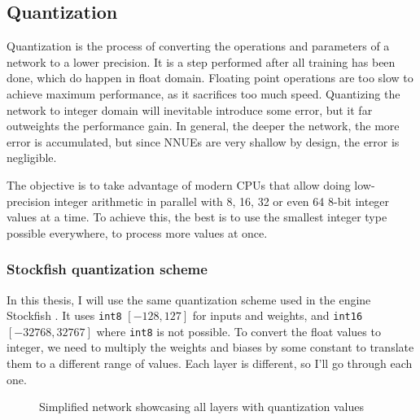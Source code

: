 \subsection{Quantization}


Quantization is the process of converting the operations and parameters of a network to a lower precision. It is a step performed after all training has been done, which do happen in float domain. Floating point operations are too slow to achieve maximum performance, as it sacrifices too much speed. Quantizing the network to integer domain will inevitable introduce some error, but it far outweights the performance gain. In general, the deeper the network, the more error is accumulated, but since NNUEs are very shallow by design, the error is negligible.

The objective is to take advantage of modern CPUs that allow doing low-precision integer arithmetic in parallel with 8, 16, 32 or even 64 8-bit integer values at a time. To achieve this, the best is to use the smallest integer type possible everywhere, to process more values at once.

\subsubsection{Stockfish quantization scheme}

\def\int#1{\texttt{int#1}}

In this thesis, I will use the same quantization scheme used in the engine Stockfish \cite{nnue-pytorch}. It uses \int{8} $[-128, 127]$ for inputs and weights, and \int{16} $[-32768, 32767]$ where \int{8} is not possible.
To convert the float values to integer, we need to multiply the weights and biases by some constant to translate them to a different range of values. Each layer is different, so I'll go through each one.

\begin{figure}[H]
\centering
{}
\caption{Simplified network showcasing all layers with quantization values}
\label{fig:quantization}
\end{figure}

